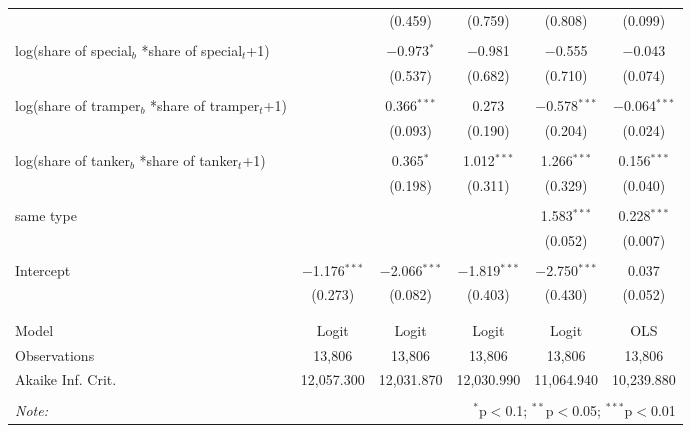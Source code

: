 \begin{tabular}{@{\extracolsep{5pt}}lccccc}
  &  & (0.459) & (0.759) & (0.808) & (0.099) \\ 
  & & & & & \\ 
 log(share of special$_{b}$ *share of special$_{t}$+1) &  & $-$0.973$^{*}$ & $-$0.981 & $-$0.555 & $-$0.043 \\ 
  &  & (0.537) & (0.682) & (0.710) & (0.074) \\ 
  & & & & & \\ 
 log(share of tramper$_{b}$ *share of tramper$_{t}$+1) &  & 0.366$^{***}$ & 0.273 & $-$0.578$^{***}$ & $-$0.064$^{***}$ \\ 
  &  & (0.093) & (0.190) & (0.204) & (0.024) \\ 
  & & & & & \\ 
 log(share of tanker$_{b}$ *share of tanker$_{t}$+1) &  & 0.365$^{*}$ & 1.012$^{***}$ & 1.266$^{***}$ & 0.156$^{***}$ \\ 
  &  & (0.198) & (0.311) & (0.329) & (0.040) \\ 
  & & & & & \\ 
 same type &  &  &  & 1.583$^{***}$ & 0.228$^{***}$ \\ 
  &  &  &  & (0.052) & (0.007) \\ 
  & & & & & \\ 
 Intercept & $-$1.176$^{***}$ & $-$2.066$^{***}$ & $-$1.819$^{***}$ & $-$2.750$^{***}$ & 0.037 \\ 
  & (0.273) & (0.082) & (0.403) & (0.430) & (0.052) \\ 
  & & & & & \\ 
\hline \\[-1.8ex] 
Model & Logit & Logit & Logit & Logit & OLS \\ 
Observations & 13,806 & 13,806 & 13,806 & 13,806 & 13,806 \\ 
Akaike Inf. Crit. & 12,057.300 & 12,031.870 & 12,030.990 & 11,064.940 & 10,239.880 \\ 
\hline 
\hline \\[-1.8ex] 
\textit{Note:}  & \multicolumn{5}{r}{$^{*}$p$<$0.1; $^{**}$p$<$0.05; $^{***}$p$<$0.01} \\ 
\end{tabular} 
